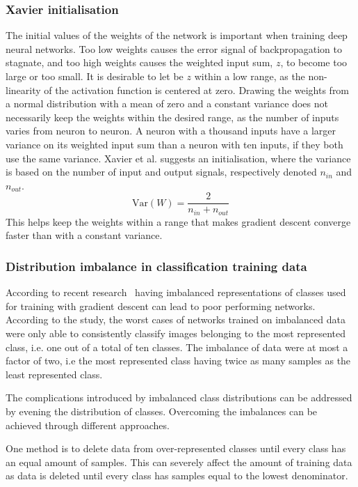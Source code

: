 \subsubsection{Xavier initialisation}
The initial values of the weights of the network is important when training deep neural networks. Too low weights causes the error signal of backpropagation to stagnate, and too high weights causes the weighted input sum, $z$, to become too large or too small. It is desirable to let be $z$ within a low range, as the non-linearity of the activation function is centered at zero.
Drawing the weights from a normal distribution with a mean of zero and a constant variance does not necessarily keep the weights within the desired range, as the number of inputs varies from neuron to neuron. A neuron with a thousand inputs have a larger variance on its weighted input sum than a neuron with ten inputs, if they both use the same variance.
Xavier et al. \cite{DBLP:journals/jmlr/GlorotB10} suggests an initialisation, where the variance is based on the number of input and output signals, respectively denoted $n_{in}$ and $n_{out}$.
$$ \text{Var}(W) = \frac{2}{n_{in} + n_{out}} $$
This helps keep the weights within a range that makes gradient descent converge faster than with a constant variance.

\subsubsection{Distribution imbalance in classification training data}
\label{sub:data-req}
According to recent research~\cite{balanced-classes} having imbalanced representations of classes used for training with gradient descent can lead to poor performing networks. According to the study, the worst cases of networks trained on imbalanced data were only able to consistently classify images belonging to the most represented class, i.e. one out of a total of ten classes. The imbalance of data were at most a factor of two, i.e the most represented class having twice as many samples as the least represented class.

The complications introduced by imbalanced class distributions can be addressed by evening the distribution of classes. Overcoming the imbalances can be achieved through different approaches.

One method is to delete data from over-represented classes until every class has an equal amount of samples. This can severely affect the amount of training data as data is deleted until every class has samples equal to the lowest denominator.

